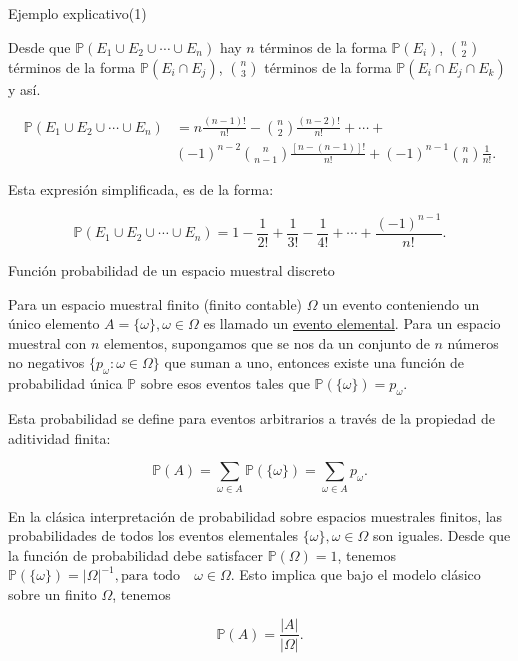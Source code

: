 \documentclass{beamer}
\begin{document}
\begin{frame}{Ejemplo explicativo(1)}
	
\scriptsize{Desde que $\mathbb{P}(E_1 \cup E_2 \cup \cdots \cup E_n) $ hay $n$ t\'erminos de la forma $\mathbb{P}(E_i)$, $\binom{n}{2}$ t\'erminos de la forma $\mathbb{P}(E_i \cap E_j)$, $\binom{n}{3}$ t\'erminos de la forma $\mathbb{P}(E_i \cap E_j \cap E_k)$ y as\'i.
	
\begin{align*}
\mathbb{P}(E_1 \cup E_2 \cup \cdots \cup E_n) &= n\frac{(n -1)!}{n!} - \binom{n}{2}\frac{(n -2)!}{n!} + \cdots  + \\
&(-1)^{n -2}\binom{n}{n -1}\frac{[n - (n -1)]!}{n!} + (-1)^{n -1}\binom{n}{n}\frac{1}{n!}.
\end{align*}

\vspace{0.2cm}

Esta expresi\'on simplificada, es de la forma:

\[
\mathbb{P}(E_1 \cup E_2 \cup \cdots \cup E_n) = 1 - \frac{1}{2!} + \frac{1}{3!} - \frac{1}{4!}+ \cdots + \frac{(-1)^{n -1}}{n!}.
\]
}
\end{frame}
\begin{frame}{Funci\'on  probabilidad de un espacio muestral discreto}

\scriptsize{Para un espacio muestral finito (finito contable) $\Omega$ un evento conteniendo un \'unico elemento $A = \{\omega\}, \omega \in \Omega$ es llamado un \underline {evento elemental}. Para un espacio  muestral con $n$ elementos, supongamos que se nos da un conjunto de $n$ n\'umeros no negativos $\{ p_{\omega}: \omega \in \Omega\}$ que suman a uno, entonces existe  una funci\'on de probabilidad \'unica $\mathbb{P}$ sobre esos eventos tales que $\mathbb{P} (\{\omega\}) = p_{\omega}$.

Esta probabilidad se define para eventos arbitrarios a trav\'es de la propiedad de aditividad finita:

\[
\mathbb{P}(A)=\sum_{\omega\in A} \mathbb{P}(\{\omega\})=\sum_{\omega\in A} p_{\omega}.
\]

En la cl\'asica interpretaci\'on  de probabilidad sobre espacios  muestrales finitos, las probabilidades de todos los eventos elementales $\{ \omega\}, \omega \in \Omega$ son iguales. Desde que la funci\'on de probabilidad debe satisfacer $\mathbb{P}(\Omega) =  1$, tenemos $\mathbb{P}(\{\omega\})=\vert \Omega\vert^{-1}, \text{para todo}\quad \omega\in\Omega.$ Esto implica que bajo el modelo cl\'asico sobre un finito $\Omega$, tenemos

\[
\mathbb{P}(A)=\frac{\vert A\vert}{\vert \Omega\vert}.
\]

}
\end{frame}
\end{document}
